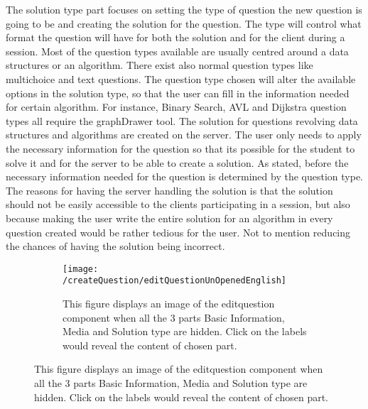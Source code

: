 The solution type part focuses on setting the type of question the new question is going to be and creating the solution for the question. The type will control what format the question will have for both the solution and for the client during a session. Most of the question types available are usually centred around a data structures or an algorithm. There exist also normal question types like multichoice and text questions. The question type chosen will alter the available options in the solution type, so that the user can fill in the information needed for certain algorithm. For instance, Binary Search, AVL and Dijkstra question types all require the graphDrawer tool. The solution for questions revolving data structures and algorithms are created on the server. The user only needs to apply the necessary information for the question so that its possible for the student to solve it and for the server to be able to create a solution. As stated, before the necessary information needed for the question is determined by the question type. The reasons for having the server handling the solution is that the solution should not be easily accessible to the clients participating in a session, but also because making the user write the entire solution for an algorithm in every question created would be rather tedious for the user. Not to mention reducing the chances of having the solution being incorrect.
\begin{figure}[H]
	\centering
	\begin{subfigure}{0.30\linewidth}
		\texttt{[image: /createQuestion/editQuestionUnOpenedEnglish]}
		\caption{This figure displays an image of the editquestion component when all the 3 parts Basic Information, Media and Solution type are hidden. Click on the labels would reveal the content of chosen part.}
		\label{fig:editquestionUnOpened}
	\end{subfigure}
\end{figure}
